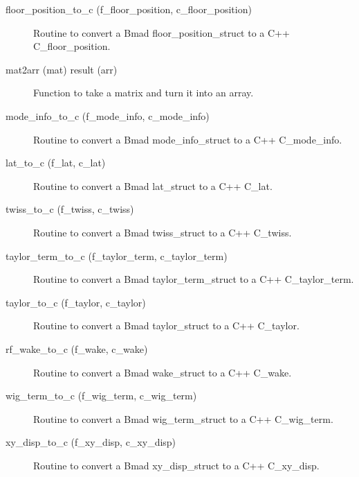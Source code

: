 \begin{description}
\label{r:floor.position.to.c}
\item[floor_position_to_c (f_floor_position, c_floor_position)] \Newline 
Routine to convert a Bmad floor_position_struct to a C++ C_floor_position.

\label{r:mat2arr}
\item[mat2arr (mat) result (arr)] \Newline 
Function to take a matrix and turn it into an array.

\label{r:mode.info.to.c}
\item[mode_info_to_c (f_mode_info, c_mode_info)] \Newline 
Routine to convert a Bmad mode_info_struct to a C++ C_mode_info.

\label{r:lat.to.c}
\item[lat_to_c (f_lat, c_lat)] \Newline 
Routine to convert a Bmad lat_struct to a C++ C_lat.

\label{r:twiss.to.c}
\item[twiss_to_c (f_twiss, c_twiss)] \Newline 
Routine to convert a Bmad twiss_struct to a C++ C_twiss.

\label{r:taylor.term.to.c}
\item[taylor_term_to_c (f_taylor_term, c_taylor_term)] \Newline 
Routine to convert a Bmad taylor_term_struct to a C++ C_taylor_term.

\label{r:taylor.to.c}
\item[taylor_to_c (f_taylor, c_taylor)] \Newline 
Routine to convert a Bmad taylor_struct to a C++ C_taylor.

\label{r:rf.wake.to.c}
\item[rf_wake_to_c (f_wake, c_wake)] \Newline 
Routine to convert a Bmad wake_struct to a C++ C_wake.

\label{r:wig.term.to.c}
\item[wig_term_to_c (f_wig_term, c_wig_term)] \Newline 
Routine to convert a Bmad wig_term_struct to a C++ C_wig_term.

\label{r:xy.disp.to.c}
\item[xy_disp_to_c (f_xy_disp, c_xy_disp)] \Newline
Routine to convert a Bmad xy_disp_struct to a C++ C_xy_disp.

\end{description}

